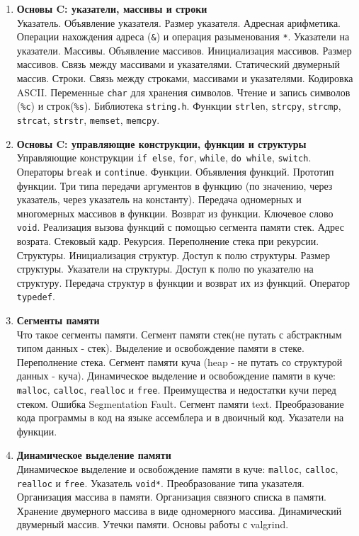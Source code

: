 \documentclass{article}
\begin{document}
\begin{enumerate}
\item \textbf{Основы C: указатели, массивы и строки}\\
Указатель. Объявление указателя. Размер указателя. Адресная арифметика. Операции нахождения адреса (\texttt{\&}) и операция разыменования \texttt{*}. Указатели на указатели. Массивы. Объявление массивов. Инициализация массивов. Размер массивов. Связь между массивами и указателями. Статический двумерный массив. Строки. Связь между строками, массивами и указателями. Кодировка ASCII. Переменные \texttt{char} для хранения символов. Чтение и запись символов (\texttt{\%с}) и строк(\texttt{\%s}). Библиотека \texttt{string.h}. Функции \texttt{strlen}, \texttt{strcpy}, \texttt{strcmp}, \texttt{strcat}, \texttt{strstr}, \texttt{memset}, \texttt{memcpy}.

\item \textbf{Основы C: управляющие конструкции, функции и структуры}\\
Управляющие конструкции \texttt{if else}, \texttt{for}, \texttt{while}, \texttt{do while}, \texttt{switch}. Операторы \texttt{break} и \texttt{continue}. Функции. Объявления функций. Прототип функции. Три типа передачи аргументов в функцию (по значению, через указатель, через указатель на константу). Передача одномерных и многомерных массивов в функции. Возврат из функции. Ключевое слово \texttt{void}. Реализация вызова функций с помощью сегмента памяти стек. Адрес возрата. Стековый кадр. Рекурсия. Переполнение стека при рекурсии. Структуры. Инициализация структур. Доступ к полю структуры. Размер структуры. Указатели на структуры. Доступ к полю по указателю на структуру. Передача структур в функции и возврат их из функций. Оператор \texttt{typedef}.

\item \textbf{Сегменты памяти}\\
Что такое сегменты памяти. Сегмент памяти стек(не путать с абстрактным типом данных - стек). Выделение и освобождение памяти в стеке. Переполнение стека. Сегмент памяти куча (heap - не путать со структурой данных - куча). Динамическое выделение и освобождение памяти в куче: \texttt{malloc}, \texttt{calloc}, \texttt{realloc} и \texttt{free}. Преимущества и недостатки кучи перед стеком. Ошибка Segmentation Fault. Сегмент памяти text. Преобразование кода программы в код на языке ассемблера и в двоичный код. Указатели на функции.

\item \textbf{Динамическое выделение памяти}\\
Динамическое выделение и освобождение памяти в куче: \texttt{malloc}, \texttt{calloc}, \texttt{realloc} и \texttt{free}.  Указатель \texttt{void*}. Преобразование типа указателя. Организация массива в памяти. Организация связного списка в памяти. Хранение двумерного массива в виде одномерного массива. Динамический двумерный массив. Утечки памяти. Основы работы с valgrind.


\end{enumerate}
\end{document}
